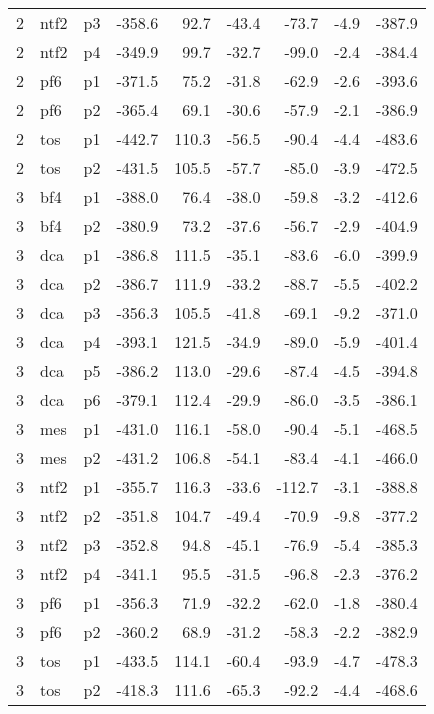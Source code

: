\documentclass[a4paper]{article}
\begin{document}
\begin{table}[ht]
\begin{tabular}{rllrrrrrr}
   2 & ntf2 & p3 & -358.6 & 92.7 & -43.4 & -73.7 & -4.9 & -387.9 \\ 
   2 & ntf2 & p4 & -349.9 & 99.7 & -32.7 & -99.0 & -2.4 & -384.4 \\ 
   2 & pf6 & p1 & -371.5 & 75.2 & -31.8 & -62.9 & -2.6 & -393.6 \\ 
   2 & pf6 & p2 & -365.4 & 69.1 & -30.6 & -57.9 & -2.1 & -386.9 \\ 
   2 & tos & p1 & -442.7 & 110.3 & -56.5 & -90.4 & -4.4 & -483.6 \\ 
   2 & tos & p2 & -431.5 & 105.5 & -57.7 & -85.0 & -3.9 & -472.5 \\ 
   3 & bf4 & p1 & -388.0 & 76.4 & -38.0 & -59.8 & -3.2 & -412.6 \\ 
   3 & bf4 & p2 & -380.9 & 73.2 & -37.6 & -56.7 & -2.9 & -404.9 \\ 
   3 & dca & p1 & -386.8 & 111.5 & -35.1 & -83.6 & -6.0 & -399.9 \\ 
   3 & dca & p2 & -386.7 & 111.9 & -33.2 & -88.7 & -5.5 & -402.2 \\ 
   3 & dca & p3 & -356.3 & 105.5 & -41.8 & -69.1 & -9.2 & -371.0 \\ 
   3 & dca & p4 & -393.1 & 121.5 & -34.9 & -89.0 & -5.9 & -401.4 \\ 
   3 & dca & p5 & -386.2 & 113.0 & -29.6 & -87.4 & -4.5 & -394.8 \\ 
   3 & dca & p6 & -379.1 & 112.4 & -29.9 & -86.0 & -3.5 & -386.1 \\ 
   3 & mes & p1 & -431.0 & 116.1 & -58.0 & -90.4 & -5.1 & -468.5 \\ 
   3 & mes & p2 & -431.2 & 106.8 & -54.1 & -83.4 & -4.1 & -466.0 \\ 
   3 & ntf2 & p1 & -355.7 & 116.3 & -33.6 & -112.7 & -3.1 & -388.8 \\ 
   3 & ntf2 & p2 & -351.8 & 104.7 & -49.4 & -70.9 & -9.8 & -377.2 \\ 
   3 & ntf2 & p3 & -352.8 & 94.8 & -45.1 & -76.9 & -5.4 & -385.3 \\ 
   3 & ntf2 & p4 & -341.1 & 95.5 & -31.5 & -96.8 & -2.3 & -376.2 \\ 
   3 & pf6 & p1 & -356.3 & 71.9 & -32.2 & -62.0 & -1.8 & -380.4 \\ 
   3 & pf6 & p2 & -360.2 & 68.9 & -31.2 & -58.3 & -2.2 & -382.9 \\ 
   3 & tos & p1 & -433.5 & 114.1 & -60.4 & -93.9 & -4.7 & -478.3 \\ 
   3 & tos & p2 & -418.3 & 111.6 & -65.3 & -92.2 & -4.4 & -468.6 \\ 

\end{tabular}
\end{table}
\end{document}
